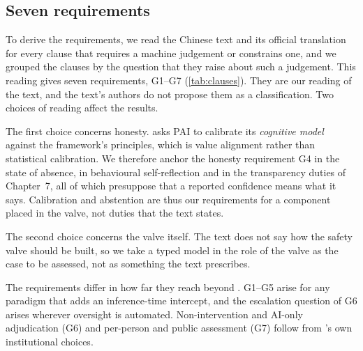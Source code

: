 \subsection{Seven requirements}
\label{sec:glist}

To derive the requirements, we read the Chinese text and its official translation for every clause that requires a machine judgement or constrains one, and we grouped the clauses by the question that they raise about such a judgement.
This reading gives seven requirements, G1--G7 (\cref{tab:clauses}).
They are our reading of the text, and the text's authors do not propose them as a classification.
Two choices of reading affect the results.

The first choice concerns honesty.
 asks PAI to calibrate its \emph{cognitive model} against the framework's principles, which is value alignment rather than statistical calibration.
We therefore anchor the honesty requirement G4 in the state of absence, in behavioural self-reflection and in the transparency duties of Chapter~7, all of which presuppose that a reported confidence means what it says.
Calibration and abstention are thus our requirements for a component placed in the valve, not duties that the text states.

The second choice concerns the valve itself.
The text does not say how the safety valve should be built, so we take a typed model in the role of the valve as the case to be assessed, not as something the text prescribes.

The requirements differ in how far they reach beyond \pol{}.
G1--G5 arise for any paradigm that adds an inference-time intercept, and the escalation question of G6 arises wherever oversight is automated.
Non-intervention and AI-only adjudication (G6) and per-person and public assessment (G7) follow from \pol{}'s own institutional choices.

